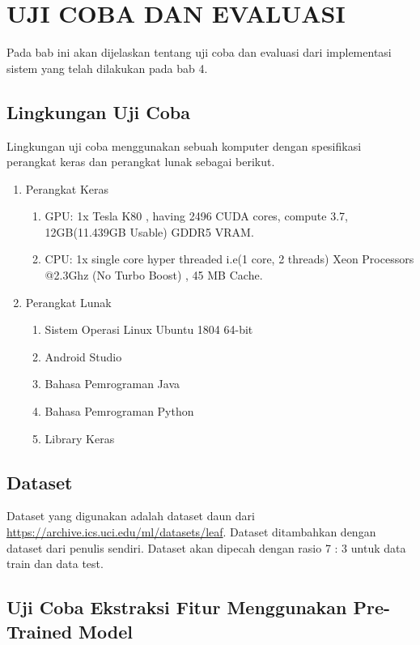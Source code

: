 \chapter{UJI COBA DAN EVALUASI}
Pada bab ini akan dijelaskan tentang uji coba dan evaluasi dari implementasi sistem yang telah dilakukan pada bab 4.

\section{Lingkungan Uji Coba}
Lingkungan uji coba menggunakan sebuah komputer dengan spesifikasi perangkat keras dan perangkat lunak sebagai berikut.

\begin{enumerate}
	\item Perangkat Keras
	\begin{enumerate}
		\item GPU: 1x Tesla K80 , having 2496 CUDA cores, compute 3.7, 12GB(11.439GB Usable) GDDR5 VRAM.
		\item CPU: 1x single core hyper threaded i.e(1 core, 2 threads) Xeon Processors @2.3Ghz (No Turbo Boost) , 45 MB Cache.
	\end{enumerate}
	\item Perangkat Lunak
	\begin{enumerate}
		\item Sistem Operasi Linux Ubuntu 1804 64-bit
		\item Android Studio
		\item Bahasa Pemrograman Java
		\item Bahasa Pemrograman Python
		\item Library Keras
	\end{enumerate}
\end{enumerate}

\section{Dataset}
\par Dataset yang digunakan adalah dataset daun dari \url{https://archive.ics.uci.edu/ml/datasets/leaf}. Dataset ditambahkan dengan dataset dari penulis sendiri. Dataset akan dipecah dengan rasio 7 : 3 untuk data train dan data test. 

\section{Uji Coba Ekstraksi Fitur Menggunakan Pre-Trained Model}

